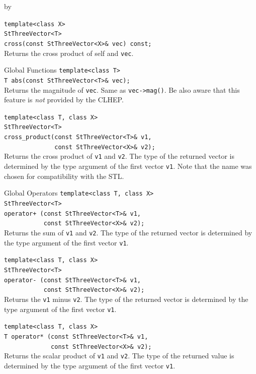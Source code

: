 \documentclass[twoside]{article}
\newcommand{\comp}[1]{\texttt{#1}}%
\newcommand{\entrylabel}[1]{\mbox{\textbf{{#1}}}\hfil}%
\newenvironment{entry}
{\begin{list}{}%
    {\renewcommand{\makelabel}{\entrylabel}%
     \setlength{\labelwidth}{90pt}%
     \setlength{\leftmargin}{\labelwidth}
     \advance\leftmargin by \labelsep%
      }%
    }%
  {\end{list}}
\newcommand{\Entrylabel}[1]%
{\raisebox{0pt}[1ex][0pt]{\makebox[\labelwidth][l]%
    {\parbox[t]{\labelwidth}{\hspace{0pt}\textbf{{#1}}}}}}
\newenvironment{Entry}%
{\renewcommand{\entrylabel}{\Entrylabel}\begin{entry}}%
  {\end{entry}}
\begin{document}
\begin{description}
\begin{Entry}
    \verb+template<class X>+\\
    \verb+StThreeVector<T>+\\
    \verb+cross(const StThreeVector<X>& vec) const;+\\
    Returns the cross product of self and \comp{vec}.
    
\item[Global Functions]
    \verb+template<class T>+\\
    \verb+T abs(const StThreeVector<T>& vec);+\\ 
    Returns the magnitude of \comp{vec}. Same as
    \verb+vec->mag()+.
    Be also aware that this feature is {\em not} provided by
    the CLHEP.
    
    \verb+template<class T, class X>+\\
    \verb+StThreeVector<T>+\\
    \verb+cross_product(const StThreeVector<T>& v1,+\\
    \verb+              const StThreeVector<X>& v2);+\\
    Returns the cross product of \comp{v1} and \comp{v2}.
    The type of the returned vector is determined by the type
    argument of the first vector \comp{v1}. Note that the
    name was chosen for compatibility with the STL.
    
\item[Global Operators]
    \verb+template<class T, class X>+\\
    \verb+StThreeVector<T>+\\
    \verb#operator+ (const StThreeVector<T>& v1,#\\
    \verb+           const StThreeVector<X>& v2);+\\
    Returns the sum of \comp{v1} and \comp{v2}.
    The type of the returned vector is determined by the type
    argument of the first vector \comp{v1}.
    
    \verb+template<class T, class X>+\\
    \verb+StThreeVector<T>+\\
    \verb+operator- (const StThreeVector<T>& v1,+\\
    \verb+           const StThreeVector<X>& v2);+\\
    Returns the \comp{v1} minus \comp{v2}.
    The type of the returned vector is determined by the type
    argument of the first vector \comp{v1}.
     
    \verb+template<class T, class X>+\\
    \verb+T operator* (const StThreeVector<T>& v1,+\\
    \verb+             const StThreeVector<X>& v2);+\\
    Returns the scalar product of \comp{v1} and \comp{v2}.
    The type of the returned value is determined by the type
    argument of the first vector \comp{v1}.
    

\end{Entry}
\end{description}
\end{document}
